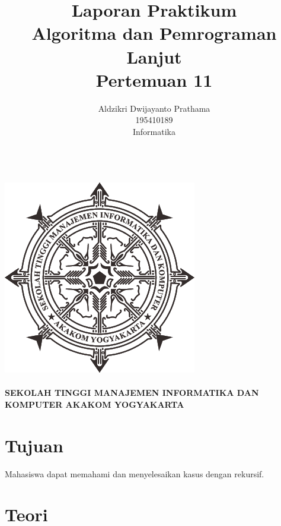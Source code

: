 \documentclass[a4paper,12pt]{article}
\begin{document}
\title{ {\Large Laporan Praktikum}\\ Algoritma dan Pemrograman Lanjut\\{\Large Pertemuan 11}}

\author{Aldzikri Dwijayanto Prathama
    \\195410189
    \\Informatika}
\makeatletter
\begin{titlepage}
    \begin{center}
        {\huge \bfseries \@title}\\[14ex]
        \includegraphics[scale=.8]{logo}\\[4ex]
        {\large \@author}\\[12ex]
        {\large \bfseries {SEKOLAH TINGGI MANAJEMEN INFORMATIKA DAN KOMPUTER
            AKAKOM YOGYAKARTA}}
    \end{center}


\end{titlepage}
\makeatother
\newpage
\tableofcontents
\newpage

\section{Tujuan}
Mahasiswa dapat memahami dan menyelesaikan kasus dengan rekursif.
\section{Teori}
\end{document}

